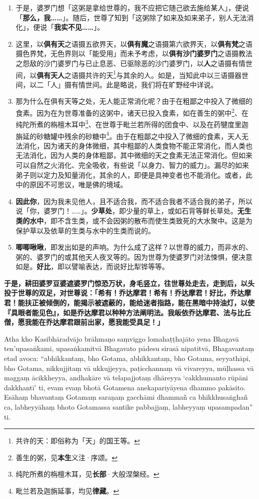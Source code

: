 \begin{enumerate}\item 于是，婆罗门想「这粥是拿给世尊的，我不应把它随己欲去施给某人」，便说「\textbf{那么，我……}」。随后，世尊了知到「这粥除了如来及如来弟子，别人无法消化」，便说「\textbf{我实不见……}」。
\item 这里，以\textbf{俱有天}之语摄五欲界天，以\textbf{俱有魔}之语摄第六欲界天，以\textbf{俱有梵}之语摄色界梵，无色界则以「能受用」而未予考虑，以\textbf{俱有沙门婆罗门}之语摄教法之怨敌的沙门婆罗门与已止息恶、已驱除恶的沙门婆罗门，以\textbf{人}之语摄有情世间，以\textbf{俱有天人}之语摄共许的天\footnote{共许的天：即俗称为「天」的国王等。}与其余的人。如是，当知此中以三语摄器世间，以二「人」摄有情世间。此是略说，我们将在旷野经中详说。
\item 那为什么在俱有天等之处，无人能正常消化呢？由于在粗鄙之中投入了微细的食素。因为在为世尊准备的这粥中，诸天已投入食素，如在善生的粥中\footnote{善生的粥，见\textbf{本生}义注·序颂。}、在纯陀所煮的栴檀木耳中\footnote{纯陀所煮的栴檀木耳，见\textbf{长部}·大般涅槃经。}、在世尊于毗兰若所得的团食中、以及在药犍度里迦旃延的砂糖罐中残余的砂糖中\footnote{毗兰若及迦旃延事，均见\textbf{律藏}。}。由于在粗鄙之中投入了微细的食素，天人无法消化，因为诸天的身体微细，其中粗鄙的人类食物不能正常消化，而人类也无法消化，因为人类的身体粗鄙，其中微细的天之食素无法正常消化。但如来可以自然之火消化、完全吸收，有些说「以身力、智力的威力」。漏尽的如来弟子则以定力及知量消化，其余的人，即便是具神变者也不能消化。或者，此中的原因不可思议，唯是佛的境域。
\item \textbf{因此你}，因为我未见他人，且不适合我，而不适合我者不适合我的弟子，所以说「你，婆罗门！……」。\textbf{少草处}，即少量的草上，或如石背等鲜长草处。\textbf{无生类的水中}，即不含生类，或不会因粥的散布而使生类致死的大水聚中。这是为保护草以及依草的生类与水中的生类而说的。
\item \textbf{唧唧啾啾}，即发出如是的声响。为什么成了这样？以世尊的威力，而非水的、粥的、婆罗门的或其他天人夜叉等的。因为世尊为使婆罗门对法悚惧，便决意如是。\textbf{好比}，即以譬喻表达，而说好比犁铧等等。\end{enumerate}

\textbf{于是，耕田婆罗豆婆遮婆罗门惊恐万状，身毛竖立，往世尊处走去，走到后，以头投于世尊的双足，对世尊说：「希有！乔达摩君！希有！乔达摩君！好比，乔达摩君！能扶正被倾倒的，能揭示被遮蔽的，能给迷者指路，能在黑暗中持油灯，以使『具眼者能见色』，如是乔达摩君以种种方法阐明法。我皈依乔达摩君、法与比丘僧，愿我能在乔达摩君跟前出家，愿我能受具足！」}

Atha kho Kasibhāradvājo brāhmaṇo saṃviggo lomahaṭṭhajāto yena Bhagavā ten’upasaṅkami, upasaṅkamitvā Bhagavato pādesu sirasā nipatitvā, Bhagavantaṃ etad avoca: “abhikkantaṃ, bho Gotama, abhikkantaṃ, bho Gotama, seyyathāpi, bho Gotama, nikkujjitaṃ vā ukkujjeyya, paṭicchannaṃ vā vivareyya, mūḷhassa vā maggaṃ ācikkheyya, andhakāre vā telapajjotaṃ dhāreyya ‘cakkhumanto rūpāni dakkhantī’ ti, evam evaṃ bhotā Gotamena anekapariyāyena dhammo pakāsito. Esāhaṃ bhavantaṃ Gotamaṃ saraṇaṃ gacchāmi dhammañ ca bhikkhusaṅghañ ca, labheyyāhaṃ bhoto Gotamassa santike pabbajjaṃ, labheyyaṃ upasampadan” ti.

